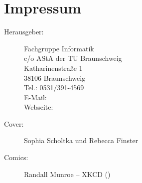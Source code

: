 
\section{Impressum}
\label{impressum}
\begin{description}
\item[Herausgeber:]
	Fachgruppe Informatik\\
	c/o AStA der TU Braunschweig\\
	Katharinenstraße 1\\
	38106 Braunschweig\\
	Tel.: 0531/391-4569\\
	E-Mail: \\
	Webseite: \fginfoUrl
\item[Cover:] Sophia Scholtka und Rebecca Finster
\item[Comics:] Randall Munroe -- XKCD ()
\end{description}
